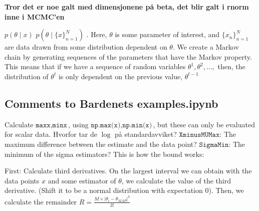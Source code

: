 \documentclass{article}
\begin{document}
\textbf{Tror det er noe galt med dimensjonene på beta, det blir galt i rnorm inne i MCMC'en}


$p\left(\theta\mid x\right)$  $p(\theta\mid \{x\}_{n=1}^N)$
\cite{BDA3}. Here, $\theta$ is some parameter of interest, and $\{x_n\}_{n=1}^N$ are data drawn from some distribution dependent on $\theta$. We create a Markov chain by generating sequences of the parameters that have the Markov property. This means that if we have a sequence of random variables $\theta^1, \theta^2, \ldots,$ then, the distribution of $\theta^t$ is only dependent on the previous value, $\theta^{t-1}$ 



\subsection{Comments to Bardenets examples.ipynb}
Calculate $\texttt{maxx}, \texttt{minx}$, using $\texttt{np.max(x)}, \texttt{np.min(x)}$, but these can only be evaluated for scalar data.
Hvorfor tar de $\log$ på standardavviket? 
$\texttt{XminusMUMax}$: The maximum difference between the estimate and the data point? $\texttt{SigmaMin}$: The minimum of the sigma estimators?
This is how the bound works: 

First: Calculate third derivatives. On the largest interval we can obtain with the data points $x$ and some estimator of $\theta$, we calculate the value of the third derivative. (Shift it to be a normal distribution with expectation 0). Then, we calculate the remainder $R = \frac{M\times|\theta_i-\theta_{MAP}|^3}{3!}$
\end{document}
